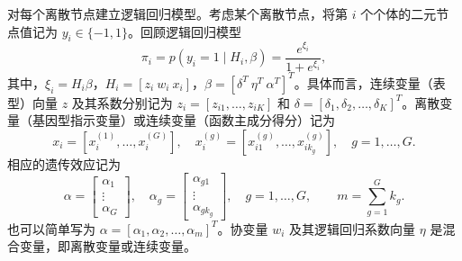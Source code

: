 对每个离散节点建立逻辑回归模型。考虑某个离散节点，将第 $i$ 个个体的二元节点值记为 $y_i\in\{-1,1\}$。回顾逻辑回归模型
\begin{equation}
\pi_i=p(y_i=1\mid H_i,\beta)=\frac{e^{\xi_i}}{1+e^{\xi_i}},
\tag{2.59}
\end{equation}
其中，$\xi_i=H_i\beta$，$H_i=[z_i\ w_i\ x_i]$，$\beta=[\delta^T\ \eta^T\ \alpha^T]^T$。具体而言，连续变量（表型）向量 $z$ 及其系数分别记为 $z_i=[z_{i1},\ldots,z_{iK}]$ 和 $\delta=[\delta_1,\delta_2,\ldots,\delta_K]^T$。离散变量（基因型指示变量）或连续变量（函数主成分得分）记为
\[
x_i=[x_i^{(1)},\ldots,x_i^{(G)}],\quad
x_i^{(g)}=[x_{i1}^{(g)},\ldots,x_{ik_g}^{(g)}],
\quad g=1,\ldots,G.
\]
相应的遗传效应记为
\[
\alpha=\begin{bmatrix}\alpha_1\\\vdots\\\alpha_G\end{bmatrix},
\quad
\alpha_g=\begin{bmatrix}\alpha_{g1}\\\vdots\\\alpha_{gk_g}\end{bmatrix},
\quad g=1,\ldots,G,\qquad m=\sum_{g=1}^{G}k_g.
\]
也可以简单写为 $\alpha=[\alpha_1,\alpha_2,\ldots,\alpha_m]^T$。协变量 $w_i$ 及其逻辑回归系数向量 $\eta$ 是混合变量，即离散变量或连续变量。

